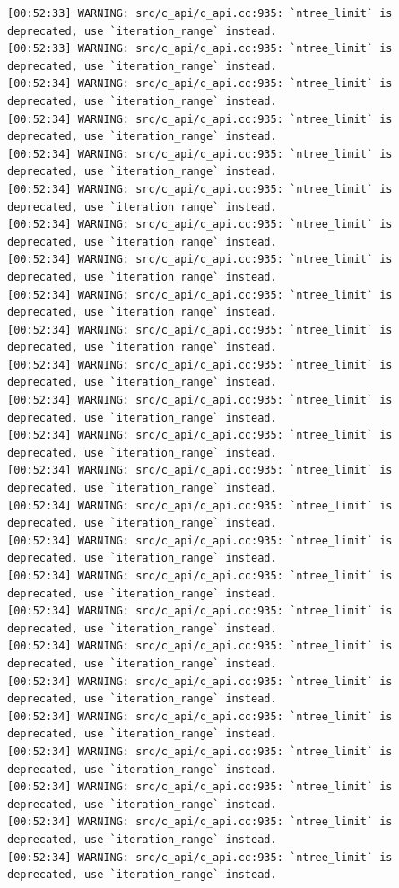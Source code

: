 \documentclass[
  letterpaper,
  DIV=11,
  numbers=noendperiod]{scrartcl}
\begin{document}
\begin{verbatim}
[00:52:33] WARNING: src/c_api/c_api.cc:935: `ntree_limit` is deprecated, use `iteration_range` instead.
[00:52:33] WARNING: src/c_api/c_api.cc:935: `ntree_limit` is deprecated, use `iteration_range` instead.
[00:52:34] WARNING: src/c_api/c_api.cc:935: `ntree_limit` is deprecated, use `iteration_range` instead.
[00:52:34] WARNING: src/c_api/c_api.cc:935: `ntree_limit` is deprecated, use `iteration_range` instead.
[00:52:34] WARNING: src/c_api/c_api.cc:935: `ntree_limit` is deprecated, use `iteration_range` instead.
[00:52:34] WARNING: src/c_api/c_api.cc:935: `ntree_limit` is deprecated, use `iteration_range` instead.
[00:52:34] WARNING: src/c_api/c_api.cc:935: `ntree_limit` is deprecated, use `iteration_range` instead.
[00:52:34] WARNING: src/c_api/c_api.cc:935: `ntree_limit` is deprecated, use `iteration_range` instead.
[00:52:34] WARNING: src/c_api/c_api.cc:935: `ntree_limit` is deprecated, use `iteration_range` instead.
[00:52:34] WARNING: src/c_api/c_api.cc:935: `ntree_limit` is deprecated, use `iteration_range` instead.
[00:52:34] WARNING: src/c_api/c_api.cc:935: `ntree_limit` is deprecated, use `iteration_range` instead.
[00:52:34] WARNING: src/c_api/c_api.cc:935: `ntree_limit` is deprecated, use `iteration_range` instead.
[00:52:34] WARNING: src/c_api/c_api.cc:935: `ntree_limit` is deprecated, use `iteration_range` instead.
[00:52:34] WARNING: src/c_api/c_api.cc:935: `ntree_limit` is deprecated, use `iteration_range` instead.
[00:52:34] WARNING: src/c_api/c_api.cc:935: `ntree_limit` is deprecated, use `iteration_range` instead.
[00:52:34] WARNING: src/c_api/c_api.cc:935: `ntree_limit` is deprecated, use `iteration_range` instead.
[00:52:34] WARNING: src/c_api/c_api.cc:935: `ntree_limit` is deprecated, use `iteration_range` instead.
[00:52:34] WARNING: src/c_api/c_api.cc:935: `ntree_limit` is deprecated, use `iteration_range` instead.
[00:52:34] WARNING: src/c_api/c_api.cc:935: `ntree_limit` is deprecated, use `iteration_range` instead.
[00:52:34] WARNING: src/c_api/c_api.cc:935: `ntree_limit` is deprecated, use `iteration_range` instead.
[00:52:34] WARNING: src/c_api/c_api.cc:935: `ntree_limit` is deprecated, use `iteration_range` instead.
[00:52:34] WARNING: src/c_api/c_api.cc:935: `ntree_limit` is deprecated, use `iteration_range` instead.
[00:52:34] WARNING: src/c_api/c_api.cc:935: `ntree_limit` is deprecated, use `iteration_range` instead.
[00:52:34] WARNING: src/c_api/c_api.cc:935: `ntree_limit` is deprecated, use `iteration_range` instead.
[00:52:34] WARNING: src/c_api/c_api.cc:935: `ntree_limit` is deprecated, use `iteration_range` instead.

\end{verbatim}
\end{document}
